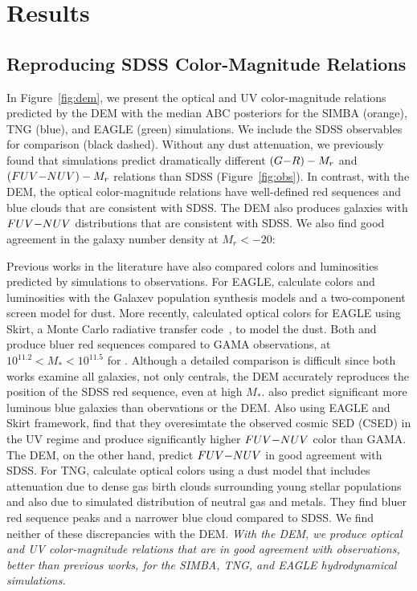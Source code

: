 \section{Results} \label{sec:results}
\subsection{Reproducing SDSS Color-Magnitude Relations} 
In Figure~\ref{fig:dem}, we present the optical and UV color-magnitude
relations predicted by the DEM with the median ABC posteriors for the SIMBA
(orange), TNG (blue), and EAGLE (green) simulations. We include the SDSS
observables for comparison (black dashed). Without any dust attenuation, we
previously found that simulations predict dramatically different $(G{-}R) - M_r$
and $(FUV{-}NUV) - M_r$ relations than SDSS (Figure~\ref{fig:obs}). In contrast,
with the DEM, the optical color-magnitude relations have well-defined red
sequences and blue clouds that are consistent with SDSS. The DEM also produces
galaxies with $FUV{-}NUV$ distributions that are consistent with SDSS. We
also find good agreement in the galaxy number density at $M_r < -20$:

Previous works in the literature have also compared colors and luminosities
predicted by simulations to observations. For EAGLE, \cite{trayford2015}
calculate colors and luminosities with the {\sc Galaxev} population synthesis
models and a two-component screen model for dust. More recently,
\cite{trayford2017} calculated optical colors for EAGLE using {\sc Skirt}, a
Monte Carlo radiative transfer code~\citep{camps2015}, to model the dust.
Both \cite{trayford2015} and \cite{trayford2017} produce bluer red sequences
compared to GAMA observations, at $10^{11.2} < M_* < 10^{11.5}$ for 
\cite{trayford2017}. Although a detailed comparison is difficult since both works
examine all galaxies, not only centrals, the DEM accurately reproduces the 
position of the SDSS red sequence, even at high $M_*$. \cite{trayford2015} 
also predict significant more luminous blue galaxies than obervations or the DEM. 
Also using EAGLE and {\sc Skirt} framework, \cite{baes2019} find
that they overesimtate the observed cosmic SED (CSED) in the UV regime and
produce significantly higher $FUV{-}NUV$ color than GAMA. The DEM, on the other hand, 
predict $FUV{-}NUV$ in good agreement with SDSS. 
For TNG, \cite{nelson2018} calculate optical colors using a dust model that
includes attenuation due to dense gas birth clouds surrounding young stellar
populations and also due to simulated distribution of neutral gas and metals.
They find bluer red sequence peaks and a narrower blue cloud compared to SDSS.
We find neither of these discrepancies with the DEM. 
\emph{With the DEM, we produce optical and UV color-magnitude relations that
are in good agreement with observations, better than previous works, for the
SIMBA, TNG, and EAGLE hydrodynamical simulations.}

